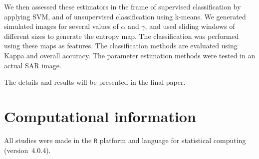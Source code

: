 \documentclass[journal]{IEEEtran}
\begin{document}
	We then assessed these estimators in the frame of supervised classification by applying SVM, and of unsupervised classification using k-means. 
	We generated simulated images for several values of $\alpha$ and $\gamma$, and used sliding windows of different sizes to generate the entropy map. 
	The classification was performed using these maps as features. 
	The classification methods are evaluated using Kappa and overall accuracy. 
	The parameter estimation methods were tested in an actual SAR image. 
	
	The details and results will be presented in the final paper.
	
	
	
	
	
	
	\section{Computational information}
	\label{conclusion}
	
	
	
	All studies were made in the \texttt R platform and language for statistical computing~\cite{RLanguage} (version~4.0.4).
	
	
	
	
	
	
\end{document}
